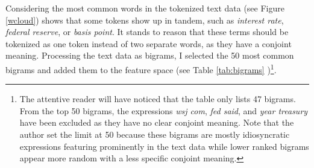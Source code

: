 \documentclass[11pt,a4paper,english,oneside]{book}
\numberwithin{equation}{chapter}
\begin{document}
Considering the most common words in the tokenized text data (see Figure \ref{wcloud}) shows that some tokens show up in tandem, such as \textit{interest rate}, \textit{federal reserve}, or \textit{basis point}. It stands to reason that these terms should be tokenized as one token instead of two separate words, as they have a conjoint meaning. Processing the text data as bigrams, I selected the 50 most common bigrams and added them to the feature space (see Table \ref{tab:bigrams} %
)\footnote{The attentive reader will have noticed that the table only lists 47 bigrams. From the top 50 bigrams, the expressions \textit{wsj com}, \textit{fed said}, and \textit{year treasury} have been excluded as they have no clear conjoint meaning. Note that the author set the limit at 50 because these bigrams are mostly idiosyncratic expressions featuring prominently in the text data while lower ranked bigrams appear more random with a less specific conjoint meaning.}.
\end{document}
